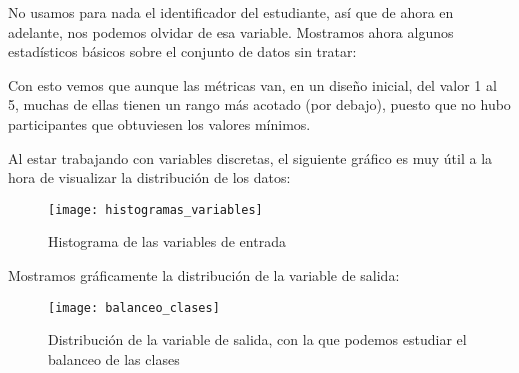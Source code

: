 No usamos para nada el identificador del estudiante, así que de ahora en adelante, nos podemos olvidar de esa variable. Mostramos ahora algunos estadísticos básicos sobre el conjunto de datos sin tratar:

\begin{table}[H]
\caption{Resumen del conjunto de datos original}
\end{table}

Con esto vemos que aunque las métricas van, en un diseño inicial, del valor 1 al 5, muchas de ellas tienen un rango más acotado (por debajo), puesto que no hubo participantes que obtuviesen los valores mínimos.

Al estar trabajando con variables discretas, el siguiente gráfico es muy útil a la hora de visualizar la distribución de los datos:

\begin{figure}[H]
    \centering
    \texttt{[image: histogramas\_variables]}
    \caption{Histograma de las variables de entrada}
    \label{fig:histogramas_variables}
\end{figure}

Mostramos gráficamente la distribución de la variable de salida:

\begin{figure}[H]
    \centering
    \texttt{[image: balanceo\_clases]}
    \caption{Distribución de la variable de salida, con la que podemos estudiar el balanceo de las clases}
    \label{fig:balanceo_clases}
\end{figure}


